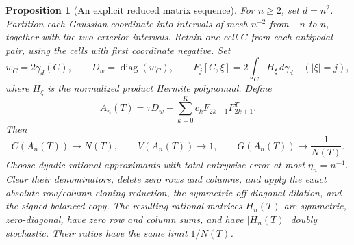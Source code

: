 \documentclass[11pt]{article}
\newtheorem{proposition}[theorem]{Proposition}
\begin{document}
\begin{proposition}[An explicit reduced matrix sequence]
\label{prop:new-odd-tail-matrix-sequence}
For $n\geq2$, set $d=n^2$.  Partition each Gaussian coordinate into
intervals of mesh $n^{-2}$ from $-n$ to $n$, together with the two
exterior intervals.  Retain one cell $C$ from each antipodal pair,
using the cells with first coordinate negative.  Set
\[
 w_C=2\gamma_d(C),\qquad D_w=\operatorname{diag}(w_C),\qquad
 F_j[C,\xi]=2\int_C H_\xi\,d\gamma_d\quad(|\xi|=j),
\]
where $H_\xi$ is the normalized product Hermite polynomial.  Define
\begin{equation}\label{eq:new-odd-tail-seed}
 A_n(T)=\tau D_w+\sum_{k=0}^Kc_kF_{2k+1}F_{2k+1}^T.
\end{equation}
Then
\begin{equation}\label{eq:new-tail-matrix-limits}
 C(A_n(T))\to N(T),\qquad V(A_n(T))\to1,
 \qquad G(A_n(T))\to\frac1{N(T)}.
\end{equation}
Choose dyadic rational approximants with total entrywise error at most
$\eta_n=n^{-4}$.  Clear their denominators, delete zero rows and
columns, and apply the exact absolute row/column cloning reduction,
the symmetric off-diagonal dilation, and the signed balanced copy.
The resulting rational matrices $H_n(T)$ are symmetric, zero-diagonal,
have zero row and column sums, and have $|H_n(T)|$ doubly stochastic.
Their ratios have the same limit $1/N(T)$.
\end{proposition}
\end{document}
